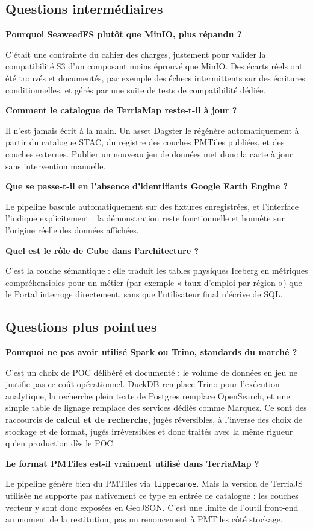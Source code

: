 \documentclass[11pt,a4paper]{article}
\newcommand{\question}[1]{\par\vspace{9pt}\headingfont\bfseries\color{navy} #1\par\vspace{2pt}\normalfont\rmfamily\color{darktext}}
\begin{document}
\subsection{Questions intermédiaires}

\question{Pourquoi SeaweedFS plutôt que MinIO, plus répandu ?}
C'était une contrainte du cahier des charges, justement pour valider la compatibilité S3 d'un composant moins éprouvé que MinIO. Des écarts réels ont été trouvés et documentés, par exemple des échecs intermittents sur des écritures conditionnelles, et gérés par une suite de tests de compatibilité dédiée.

\question{Comment le catalogue de TerriaMap reste-t-il à jour ?}
Il n'est jamais écrit à la main. Un asset Dagster le régénère automatiquement à partir du catalogue STAC, du registre des couches PMTiles publiées, et des couches externes. Publier un nouveau jeu de données met donc la carte à jour sans intervention manuelle.

\question{Que se passe-t-il en l'absence d'identifiants Google Earth Engine ?}
Le pipeline bascule automatiquement sur des fixtures enregistrées, et l'interface l'indique explicitement : la démonstration reste fonctionnelle et honnête sur l'origine réelle des données affichées.

\question{Quel est le rôle de Cube dans l'architecture ?}
C'est la couche sémantique : elle traduit les tables physiques Iceberg en métriques compréhensibles pour un métier (par exemple « taux d'emploi par région ») que le Portal interroge directement, sans que l'utilisateur final n'écrive de SQL.

\subsection{Questions plus pointues}

\question{Pourquoi ne pas avoir utilisé Spark ou Trino, standards du marché ?}
C'est un choix de POC délibéré et documenté : le volume de données en jeu ne justifie pas ce coût opérationnel. DuckDB remplace Trino pour l'exécution analytique, la recherche plein texte de Postgres remplace OpenSearch, et une simple table de lignage remplace des services dédiés comme Marquez. Ce sont des raccourcis de \textbf{calcul et de recherche}, jugés réversibles, à l'inverse des choix de stockage et de format, jugés irréversibles et donc traités avec la même rigueur qu'en production dès le POC.

\question{Le format PMTiles est-il vraiment utilisé dans TerriaMap ?}
Le pipeline génère bien du PMTiles via \texttt{tippecanoe}. Mais la version de TerriaJS utilisée ne supporte pas nativement ce type en entrée de catalogue : les couches vecteur y sont donc exposées en GeoJSON. C'est une limite de l'outil front-end au moment de la restitution, pas un renoncement à PMTiles côté stockage.
\end{document}
